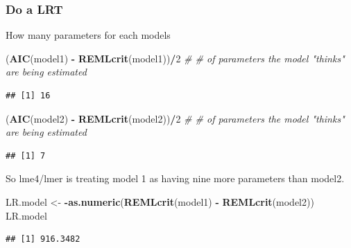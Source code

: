 \documentclass[
]{article}
\newenvironment{Shaded}{\begin{snugshade}}{\end{snugshade}}
\newcommand{\CommentTok}[1]{\textcolor[rgb]{0.56,0.35,0.01}{\textit{#1}}}
\newcommand{\DecValTok}[1]{\textcolor[rgb]{0.00,0.00,0.81}{#1}}
\newcommand{\KeywordTok}[1]{\textcolor[rgb]{0.13,0.29,0.53}{\textbf{#1}}}
\newcommand{\NormalTok}[1]{#1}
\newcommand{\OperatorTok}[1]{\textcolor[rgb]{0.81,0.36,0.00}{\textbf{#1}}}
\newcommand{\StringTok}[1]{\textcolor[rgb]{0.31,0.60,0.02}{#1}}
\begin{document}
\hypertarget{do-a-lrt-4}{%
\subsubsection{Do a LRT}\label{do-a-lrt-4}}

How many parameters for each models

\begin{Shaded}
\begin{Highlighting}[]
\NormalTok{(}\KeywordTok{AIC}\NormalTok{(model1) }\OperatorTok{-}\StringTok{ }\KeywordTok{REMLcrit}\NormalTok{(model1))}\OperatorTok{/}\DecValTok{2} \CommentTok{# # of parameters the model "thinks" are being estimated}
\end{Highlighting}
\end{Shaded}

\begin{verbatim}
## [1] 16
\end{verbatim}

\begin{Shaded}
\begin{Highlighting}[]
\NormalTok{(}\KeywordTok{AIC}\NormalTok{(model2) }\OperatorTok{-}\StringTok{ }\KeywordTok{REMLcrit}\NormalTok{(model2))}\OperatorTok{/}\DecValTok{2} \CommentTok{# # of parameters the model "thinks" are being estimated}
\end{Highlighting}
\end{Shaded}

\begin{verbatim}
## [1] 7
\end{verbatim}

So lme4/lmer is treating model 1 as having nine more parameters than
model2.

\begin{Shaded}
\begin{Highlighting}[]
\NormalTok{LR.model <-}\StringTok{  }\OperatorTok{-}\KeywordTok{as.numeric}\NormalTok{(}\KeywordTok{REMLcrit}\NormalTok{(model1) }\OperatorTok{-}\StringTok{ }\KeywordTok{REMLcrit}\NormalTok{(model2))}
\NormalTok{LR.model}
\end{Highlighting}
\end{Shaded}

\begin{verbatim}
## [1] 916.3482
\end{verbatim}

\begin{Shaded}
\end{Shaded}
\end{document}
